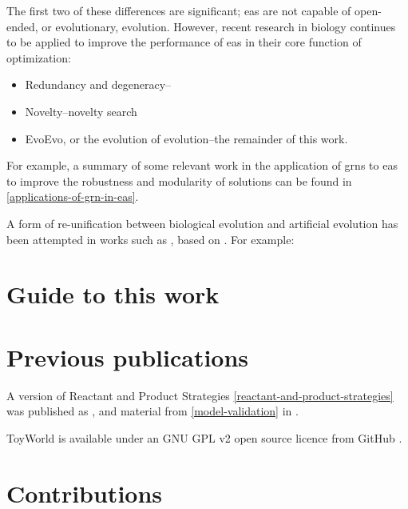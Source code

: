 The first two of these differences are significant; \glspl{ea} are not capable of open-ended, or evolutionary, evolution. However, recent research in biology continues to be applied to improve the performance of \glspl{ea} in their core function of optimization:
\begin{itemize}
	\item Redundancy and degeneracy--\eg \parencite{Whitacre:2010qy}
	\item Novelty--\eg novelty search \parencite{Lehman:2008cr}
	\item EvoEvo, or the evolution of evolution--\eg the remainder of this work.
\end{itemize}

For example, a summary of some relevant work in the application of \glspl{grn} to \glspl{ea} to improve the robustness and modularity of solutions can be found in \ref{applications-of-grn-in-eas}.

A form of re-unification between biological evolution and artificial evolution has been attempted in works such as \parencite{Paixao2015}, based on . For example: 



\section{Guide to this work}

\section{Previous publications}\label{previous-publications}

A version of Reactant and Product Strategies \cref{reactant-and-product-strategies} was published as \cite{Young2015},
and material from \cref{model-validation} in \cite{Young2013}.

ToyWorld is available under an GNU GPL v2 open source licence from GitHub \cite{toyworld}.

\section{Contributions}\label{contributions}


